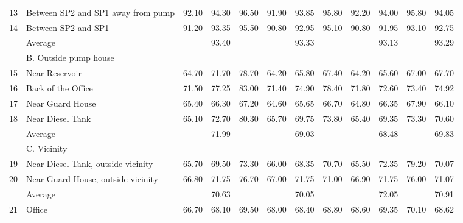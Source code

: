 \begin{table}[!h]
{{\begin{tabular}{c|p{4cm}|ccc|ccc|ccc|c}
	13 & Between SP2 and SP1 away from pump & 92.10 & 94.30 & 96.50 & 91.90 & 93.85 & 95.80 & 92.20 & 94.00 & 95.80 & 94.05 \\ 
	14 & Between SP2 and SP1 & 91.20 & 93.35 & 95.50 & 90.80 & 92.95 & 95.10 & 90.80 & 91.95 & 93.10 & 92.75 \\ 
	& Average &  & 93.40 &  &  & 93.33 &  &  & 93.13 &  & 93.29 \\ 
	\hline
	& B. Outside pump house &  &  &  &  &  &  &  &  &  &  \\ 
	15 & Near Reservoir & 64.70 & 71.70 & 78.70 & 64.20 & 65.80 & 67.40 & 64.20 & 65.60 & 67.00 & 67.70 \\ 
	16 & Back of the Office & 71.50 & 77.25 & 83.00 & 71.40 & 74.90 & 78.40 & 71.80 & 72.60 & 73.40 & 74.92 \\ 
	17 & Near Guard House & 65.40 & 66.30 & 67.20 & 64.60 & 65.65 & 66.70 & 64.80 & 66.35 & 67.90 & 66.10 \\ 
	18 & Near Diesel Tank & 65.10 & 72.70 & 80.30 & 65.70 & 69.75 & 73.80 & 65.40 & 69.35 & 73.30 & 70.60 \\ 
	& Average &  & 71.99 &  &  & 69.03 &  &  & 68.48 &  & 69.83 \\ 
	\hline
	& C. Vicinity &  &  &  &  &  &  &  &  &  &  \\ 
	19 & Near Diesel Tank, outside vicinity & 65.70 & 69.50 & 73.30 & 66.00 & 68.35 & 70.70 & 65.50 & 72.35 & 79.20 & 70.07 \\ 
	20 & Near Guard House, outside vicinity & 66.80 & 71.75 & 76.70 & 67.00 & 71.75 & 71.00 & 66.90 & 71.75 & 76.00 & 71.07 \\ 
	& Average &  & 70.63 &  &  & 70.05 &  &  & 72.05 &  & 70.91 \\ 
	\hline
	21 & Office & 66.70 & 68.10 & 69.50 & 68.00 & 68.40 & 68.80 & 68.60 & 69.35 & 70.10 & 68.62 \\ 
	\hline
\end{tabular}
	}}
\end{table}




